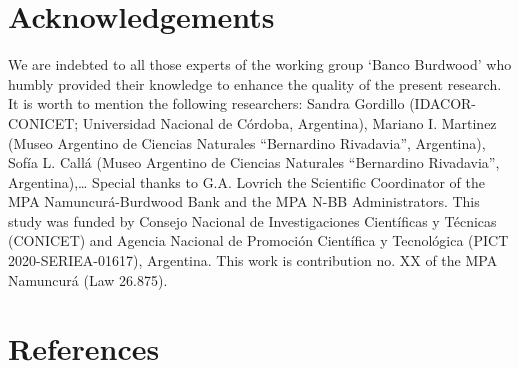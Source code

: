 \documentclass[preprint, 3p,
authoryear]{elsarticle} %
\begin{document}
\hypertarget{acknowledgements}{%
\section{Acknowledgements}\label{acknowledgements}}

We are indebted to all those experts of the working group `Banco
Burdwood' who humbly provided their knowledge to enhance the quality of
the present research. It is worth to mention the following researchers:
Sandra Gordillo (IDACOR-CONICET; Universidad Nacional de Córdoba,
Argentina), Mariano I. Martinez (Museo Argentino de Ciencias Naturales
``Bernardino Rivadavia'', Argentina), Sofía L. Callá (Museo Argentino de
Ciencias Naturales ``Bernardino Rivadavia'', Argentina),\ldots{} Special
thanks to G.A. Lovrich the Scientific Coordinator of the MPA
Namuncurá-Burdwood Bank and the MPA N-BB Administrators. This study was
funded by Consejo Nacional de Investigaciones Científicas y Técnicas
(CONICET) and Agencia Nacional de Promoción Científica y Tecnológica
(PICT 2020-SERIEA-01617), Argentina. This work is contribution no. XX of
the MPA Namuncurá (Law 26.875).

\hypertarget{references}{%
\section*{References}\label{references}}
\end{document}
